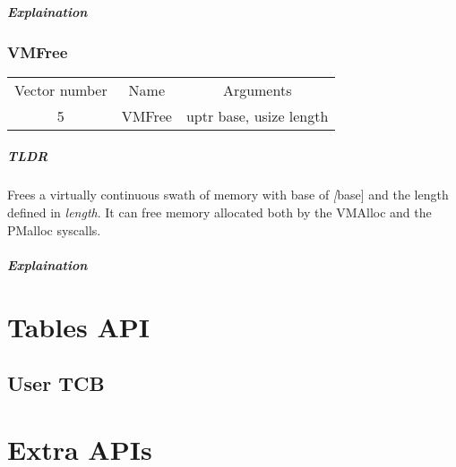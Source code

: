 \documentclass{report}
\begin{document}
\paragraph{Explaination}

\subsection{VMFree}
\begin{tabular}{ |c|c|c| }
	Vector number & Name & Arguments \\ 
	5 & VMFree & uptr base, usize length \\
\end{tabular}

\paragraph{TLDR} 
Frees a virtually continuous swath of memory with base of \textit[base] and the length defined in \textit{length}. It can free memory allocated both by the VMAlloc and the PMalloc syscalls.

\paragraph{Explaination}

\chapter{Tables API}
\section{User TCB}

\chapter{Extra APIs}
\end{document}
